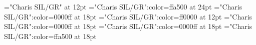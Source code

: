 \documentclass[a4paper]{article}
\begin{document}
\pagestyle{plain}
\sloppy
\setlength{\parfillskip}{0pt plus 1fil}
\font\main="Charis SIL/GR" at 12pt
\font\abcmain="Charis SIL/GR":color=ffa500 at 24pt
\font\amain="Charis SIL/GR":color=0000ff at 18pt
\font\bmain="Charis SIL/GR":color=ff0000 at 12pt
\font\abenmain="Charis SIL/GR":color=0000ff at 18pt
\font\abmain="Charis SIL/GR":color=0000ff at 18pt
\font\acmain="Charis SIL/GR":color=ffa500 at 18pt

\mbox{} 
\newpage 
\newpage 
\setcounter{page}{1} 
\pagestyle{fancy} 






\end{document}
